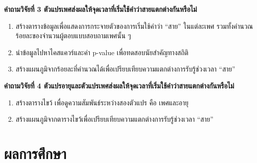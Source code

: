 \documentclass[a4paper]{article}
\begin{document}
    \textbf{คำถามวิจัยที่ 3 ตัวแปรเพศส่งผลให้จุดเวลาที่เริ่มใช้คำว่าสายแตกต่างกันหรือไม่}
    \begin{enumerate}
        \item สร้างตารางข้อมูลเพื่อแสดงการกระจายตัวของการเริ่มใช้คำว่า “สาย” ในแต่ละเพศ รวมทั้งคำนวณร้อยละของจำนวนผู้ตอบแบบสอบถามเพศนั้น ๆ
        \item นำข้อมูลไปหาไคสแควร์และค่า p-value เพื่อทดสอบนัยสำคัญทางสถิติ
        \item สร้างแผนภูมิจากร้อยละที่คำนวณได้เพื่อเปรียบเทียบความแตกต่างการรับรู้ช่วงเวลา “สาย”
    \end{enumerate}

    \textbf{คำถามวิจัยที่ 4 ตัวแปรอายุและตัวแปรเพศส่งผลให้จุดเวลาที่เริ่มใช้คำว่าสายแตกต่างกันหรือไม่}
    \begin{enumerate}
        \item สร้างตารางไขว้ เพื่อดูความสัมพันธ์ระหว่างสองตัวแปร คือ เพศและอายุ
        \item สร้างแผนภูมิจากตารางไขว้เพื่อเปรียบเทียบความแตกต่างการรับรู้ช่วงเวลา “สาย”
    \end{enumerate}
\section{ผลการศึกษา}
\end{document}
